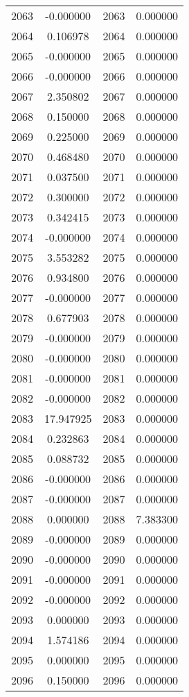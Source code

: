 \documentclass[12pt]{article}
\begin{document}
\begin{longtable}{@{}cccc@{}}
2063 & -0.000000 & 2063 & 0.000000 \\
2064 & 0.106978 & 2064 & 0.000000 \\
2065 & -0.000000 & 2065 & 0.000000 \\
2066 & -0.000000 & 2066 & 0.000000 \\
2067 & 2.350802 & 2067 & 0.000000 \\
2068 & 0.150000 & 2068 & 0.000000 \\
2069 & 0.225000 & 2069 & 0.000000 \\
2070 & 0.468480 & 2070 & 0.000000 \\
2071 & 0.037500 & 2071 & 0.000000 \\
2072 & 0.300000 & 2072 & 0.000000 \\
2073 & 0.342415 & 2073 & 0.000000 \\
2074 & -0.000000 & 2074 & 0.000000 \\
2075 & 3.553282 & 2075 & 0.000000 \\
2076 & 0.934800 & 2076 & 0.000000 \\
2077 & -0.000000 & 2077 & 0.000000 \\
2078 & 0.677903 & 2078 & 0.000000 \\
2079 & -0.000000 & 2079 & 0.000000 \\
2080 & -0.000000 & 2080 & 0.000000 \\
2081 & -0.000000 & 2081 & 0.000000 \\
2082 & -0.000000 & 2082 & 0.000000 \\
2083 & 17.947925 & 2083 & 0.000000 \\
2084 & 0.232863 & 2084 & 0.000000 \\
2085 & 0.088732 & 2085 & 0.000000 \\
2086 & -0.000000 & 2086 & 0.000000 \\
2087 & -0.000000 & 2087 & 0.000000 \\
2088 & 0.000000 & 2088 & 7.383300 \\
2089 & -0.000000 & 2089 & 0.000000 \\
2090 & -0.000000 & 2090 & 0.000000 \\
2091 & -0.000000 & 2091 & 0.000000 \\
2092 & -0.000000 & 2092 & 0.000000 \\
2093 & 0.000000 & 2093 & 0.000000 \\
2094 & 1.574186 & 2094 & 0.000000 \\
2095 & 0.000000 & 2095 & 0.000000 \\
2096 & 0.150000 & 2096 & 0.000000 \\

\end{longtable}
\end{document}
